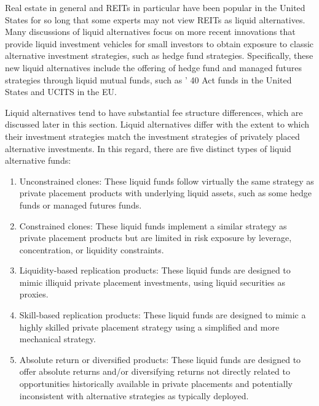 \documentclass[11pt]{article}
\begin{document}
Real estate in general and REITs in particular have been popular in the United States for so long that some experts may not view REITs as liquid alternatives. Many discussions of liquid alternatives focus on more recent innovations that provide liquid investment vehicles for small investors to obtain exposure to classic alternative investment strategies, such as hedge fund strategies. Specifically, these new liquid alternatives include the offering of hedge fund and managed futures strategies through liquid mutual funds, such as ' 40 Act funds in the United States and UCITS in the EU.

Liquid alternatives tend to have substantial fee structure differences, which are discussed later in this section. Liquid alternatives differ with the extent to which their investment strategies match the investment strategies of privately placed alternative investments. In this regard, there are five distinct types of liquid alternative funds:

\begin{enumerate}
  \item Unconstrained clones: These liquid funds follow virtually the same strategy as private placement products with underlying liquid assets, such as some hedge funds or managed futures funds.

  \item Constrained clones: These liquid funds implement a similar strategy as private placement products but are limited in risk exposure by leverage, concentration, or liquidity constraints.

  \item Liquidity-based replication products: These liquid funds are designed to mimic illiquid private placement investments, using liquid securities as proxies.

  \item Skill-based replication products: These liquid funds are designed to mimic a highly skilled private placement strategy using a simplified and more mechanical strategy.

  \item Absolute return or diversified products: These liquid funds are designed to offer absolute returns and/or diversifying returns not directly related to opportunities historically available in private placements and potentially inconsistent with alternative strategies as typically deployed.

\end{enumerate}
\end{document}
